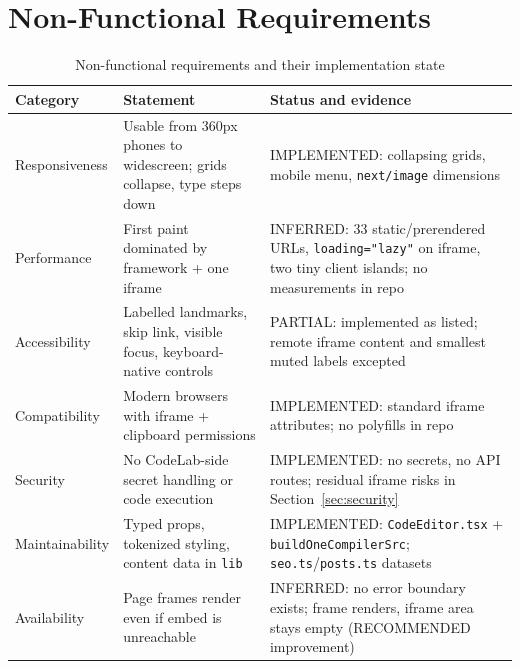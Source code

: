 \section{Non-Functional Requirements}
\label{sec:non-functional-requirements}

\begin{table}[H]
\centering
\caption{Non-functional requirements and their implementation state}
\begin{tabular}{|l|p{5cm}|p{6.5cm}|}
\hline
\textbf{Category} & \textbf{Statement} & \textbf{Status and evidence} \\ \hline
Responsiveness & Usable from 360px phones to widescreen; grids collapse, type steps down & IMPLEMENTED: collapsing grids, mobile menu, \texttt{next/image} dimensions \\ \hline
Performance & First paint dominated by framework + one iframe & INFERRED: 33 static/prerendered URLs, \texttt{loading="lazy"} on iframe, two tiny client islands; no measurements in repo \\ \hline
Accessibility & Labelled landmarks, skip link, visible focus, keyboard-native controls & PARTIAL: implemented as listed; remote iframe content and smallest muted labels excepted \\ \hline
Compatibility & Modern browsers with iframe + clipboard permissions & IMPLEMENTED: standard iframe attributes; no polyfills in repo \\ \hline
Security & No CodeLab-side secret handling or code execution & IMPLEMENTED: no secrets, no API routes; residual iframe risks in Section~\ref{sec:security} \\ \hline
Maintainability & Typed props, tokenized styling, content data in \texttt{lib} & IMPLEMENTED: \texttt{CodeEditor.tsx} + \texttt{buildOneCompilerSrc}; \texttt{seo.ts}/\texttt{posts.ts} datasets \\ \hline
Availability & Page frames render even if embed is unreachable & INFERRED: no error boundary exists; frame renders, iframe area stays empty (RECOMMENDED improvement) \\ \hline
\end{tabular}
\end{table}
